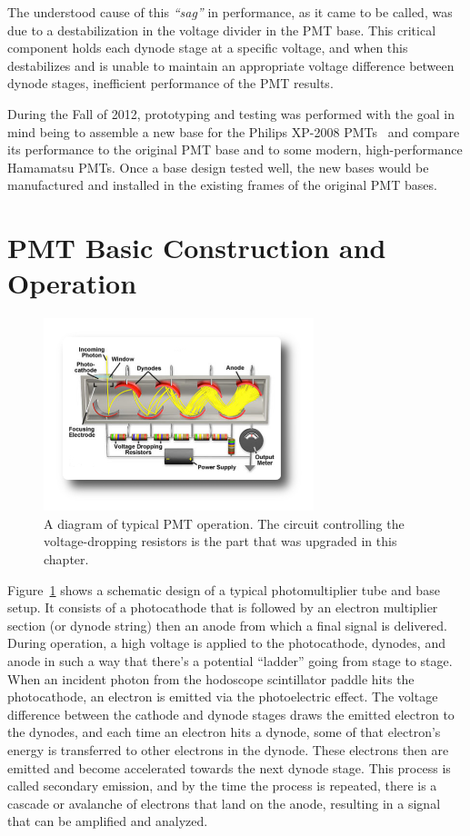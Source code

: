 The understood cause of this \emph{``sag''} in performance, as it came to be called, was due to a destabilization in the voltage divider in the PMT base. This critical component holds each dynode stage at a specific voltage, and when this destabilizes and is unable to maintain an appropriate voltage difference between dynode stages, inefficient performance of the PMT results.

During the Fall of 2012, prototyping and testing was performed with the goal in mind being to assemble a new base for the Philips XP-2008 PMTs~\cite{tubespecs} and compare its performance to the original PMT base and to some modern, high-performance Hamamatsu PMTs. Once a base design tested well, the new bases would be manufactured and installed in the existing frames of the original PMT bases.

\section{PMT Basic Construction and Operation}

\begin{figure}
	\centering
	\includegraphics[width=0.7\textwidth]{figures/pmt-diagram.png}
	\caption{A diagram of typical PMT operation. The circuit controlling the voltage-dropping resistors is the part that was upgraded in this chapter.}
	\label{fig:pmt}
\end{figure}

Figure~\ref{fig:pmt} shows a schematic design of a typical photomultiplier tube and base setup. It consists of a photocathode that is followed by an electron multiplier section (or dynode string) then an anode from which a final signal is delivered. During operation, a high voltage is applied to the photocathode, dynodes, and anode in such a way that there's a potential ``ladder'' going from stage to stage. When an incident photon from the hodoscope scintillator paddle hits the photocathode, an electron is emitted via the photoelectric effect. The voltage difference between the cathode and dynode stages draws the emitted electron to the dynodes, and each time an electron hits a dynode, some of that electron's energy is transferred to other electrons in the dynode. These electrons then are emitted and become accelerated towards the next dynode stage. This process is called secondary emission, and by the time the process is repeated, there is a cascade or avalanche of electrons that land on the anode, resulting in a signal that can be amplified and analyzed.

